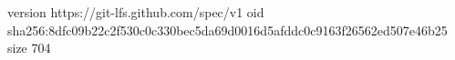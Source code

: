 version https://git-lfs.github.com/spec/v1
oid sha256:8dfc09b22c2f530c0c330bec5da69d0016d5afddc0c9163f26562ed507e46b25
size 704
